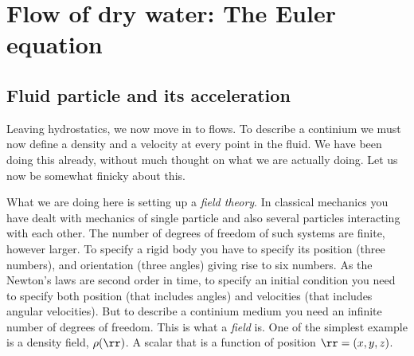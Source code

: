 \documentclass{tufte-book} %
\begin{document}
\chapter{Flow of dry water: The Euler equation}
\label{ch:dry}
\section{Fluid particle and its acceleration}
Leaving hydrostatics, we now move in to flows.  To describe a
continium we must now define a density and a velocity at every point
in the fluid. We have been doing this already, without much thought on
what we are actually doing. Let us now be somewhat finicky about
this.  

What we are doing here is setting up a \textit{field theory}. In
classical mechanics you have dealt with mechanics of single particle
and also several particles interacting with each other. The number of
degrees of freedom of such systems are finite, however larger.  To
specify a rigid body you have to specify its position (three numbers),
and orientation (three angles) giving rise to six numbers. As the
Newton's laws are second order in time, to specify an initial
condition you need to specify both position (that includes angles) and
velocities (that includes angular velocities). But to describe a
continium medium you need an infinite number of degrees of
freedom. This is what a \textit{field} is.  One of the simplest
example is a density field, $\rho(\rr)$. A scalar that is a function
of position $\rr = (x,y,z)$.  
\end{document}
